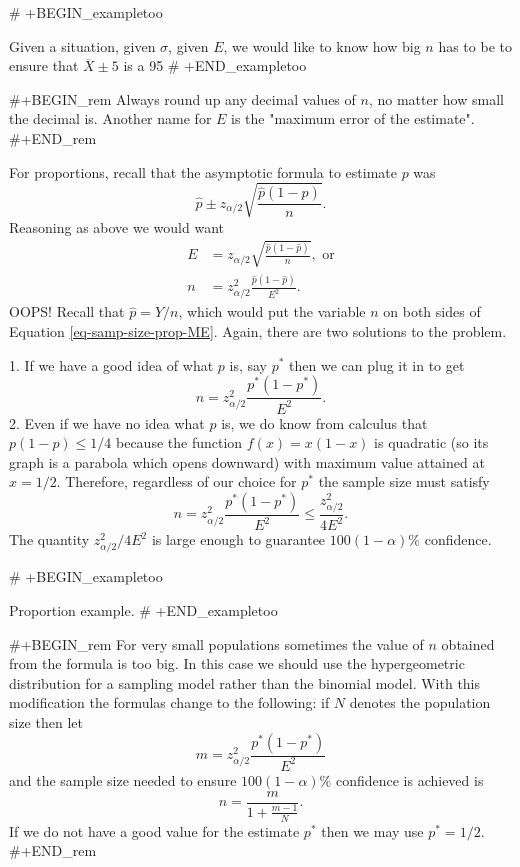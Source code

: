 # +BEGIN_exampletoo

Given a situation, given \(\sigma\), given \(E\), we would like to
know how big \(n\) has to be to ensure that \(\overline{X}\pm5\) is a
95%
# +END_exampletoo


#+BEGIN_rem
Always round up any decimal values of \(n\), no matter how small the
decimal is. Another name for \(E\) is the "maximum error of the
estimate".
#+END_rem

For proportions, recall that the asymptotic formula to estimate \(p\)
was \[ \hat{p}\pm z_{\alpha/2}\sqrt{\frac{\hat{p}(1-\hat{p})}{n}}.  \]
Reasoning as above we would want
\begin{align}
\label{eq-samp-size-prop-ME}
E & =z_{\alpha/2}\sqrt{\frac{\hat{p}(1-\hat{p})}{n}},\mbox{ or}\\
n & =z_{\alpha/2}^{2}\frac{\hat{p}(1-\hat{p})}{E^{2}}.
\end{align}
OOPS! Recall that \(\hat{p}=Y/n\), which would put the variable \(n\)
on both sides of Equation \eqref{eq-samp-size-prop-ME}. Again, there are two
solutions to the problem.

1. If we have a good idea of what \(p\) is, say \(p^{\ast}\) then we
   can plug it in to get
   \begin{equation}
   n=z_{\alpha/2}^{2}\frac{p^{\ast}(1-p^{\ast})}{E^{2}}.
   \end{equation}
2. Even if we have no idea what \(p\) is, we do know from calculus
   that \(p(1-p)\leq1/4\) because the function \(f(x)=x(1-x)\) is
   quadratic (so its graph is a parabola which opens downward) with
   maximum value attained at \(x=1/2\). Therefore, regardless of our
   choice for \(p^{\ast}\) the sample size must satisfy
   \begin{equation}
   n=z_{\alpha/2}^{2}\frac{p^{\ast}(1-p^{\ast})}{E^{2}}\leq\frac{z_{\alpha/2}^{2}}{4E^{2}}.
   \end{equation}
   The quantity \(z_{\alpha/2}^{2}/4E^{2}\) is large enough to
   guarantee \(100(1-\alpha)\%\) confidence.

# +BEGIN_exampletoo

Proportion example.
# +END_exampletoo

#+BEGIN_rem
For very small populations sometimes the value of \(n\) obtained from
the formula is too big. In this case we should use the hypergeometric
distribution for a sampling model rather than the binomial model. With
this modification the formulas change to the following: if \(N\)
denotes the population size then let
\begin{equation}
m=z_{\alpha/2}^{2}\frac{p^{\ast}(1-p^{\ast})}{E^{2}}
\end{equation}
and the sample size needed to ensure \(100(1-\alpha)\%\) confidence is
achieved is
\begin{equation}
n=\frac{m}{1+\frac{m-1}{N}}.
\end{equation}
If we do not have a good value for the estimate \(p^{\ast}\) then we may use \(p^{\ast}=1/2\).
#+END_rem


